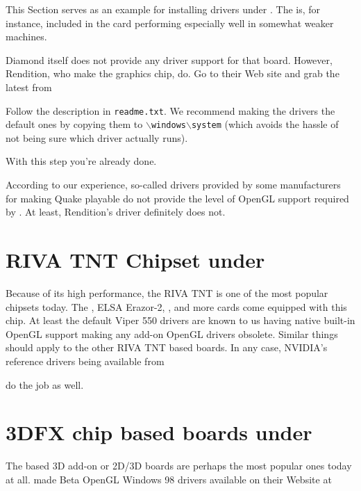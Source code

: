 This Section serves as an example for installing  drivers under
. The  is, for instance, included in
the  card performing especially well in somewhat weaker
machines.

Diamond itself does not provide any  driver support for that board.
However, Rendition, who make the graphics chip, do. Go to their Web site and grab the
latest   from


 \noindent
Follow the description in \texttt{readme.txt}. We recommend making
the drivers the default ones by copying them to
\texttt{$\backslash$windows$\backslash$system} (which avoids the
hassle of not being sure which driver actually runs).

With this step you're already done.

According to our experience, so-called  drivers
provided by some manufacturers for making Quake playable do not
provide the level of OpenGL support required by {\FlightGear}. At
least, Rendition's  driver definitely does not.

\section{RIVA TNT Chipset under
 \label{rivatnt}}

Because of its high performance, the RIVA TNT is one of the most popular chipsets today.
The ,  ELSA Erazor-2, , and
more cards come equipped with this chip. At least the default Viper 550 drivers are known
to us having native built-in OpenGL support making any add-on OpenGL drivers obsolete.
Similar things should apply to the other RIVA TNT based boards. In any case, NVIDIA's
reference drivers being available from


\noindent
 do the job as well.

\section{3DFX chip based boards under
 \label{3DFXwin98}}

The  based 3D add-on or 2D/3D boards are perhaps the
most popular ones today at all.  made Beta OpenGL
Windows 98 drivers available on their Website at

